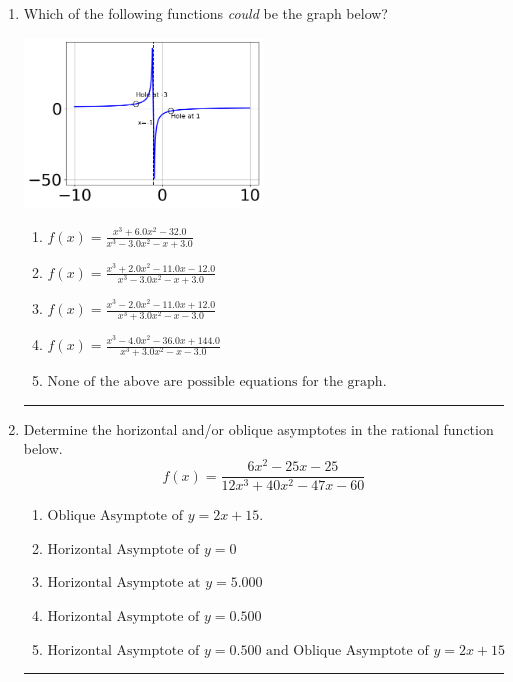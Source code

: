 \documentclass[14pt]{extbook}
\newcommand{\litem}[1]{\item#1\hspace*{-1cm}\rule{\textwidth}{0.4pt}}
\begin{document}
\begin{enumerate}
{\begin{enumerate}[label=\Alph*.]
\end{enumerate} }
\litem{
Which of the following functions \textit{could} be the graph below?
\begin{center}
    \includegraphics[width=0.5\textwidth]{../Figures/identifyGraphOfRationalFunctionCopyB.png}
\end{center}
\begin{enumerate}[label=\Alph*.]
\item \( f(x)=\frac{x^{3} +6.0 x^{2} -32.0}{x^{3} -3.0 x^{2} -x + 3.0} \)
\item \( f(x)=\frac{x^{3} +2.0 x^{2} -11.0 x -12.0}{x^{3} -3.0 x^{2} -x + 3.0} \)
\item \( f(x)=\frac{x^{3} -2.0 x^{2} -11.0 x + 12.0}{x^{3} +3.0 x^{2} -x -3.0} \)
\item \( f(x)=\frac{x^{3} -4.0 x^{2} -36.0 x + 144.0}{x^{3} +3.0 x^{2} -x -3.0} \)
\item \( \text{None of the above are possible equations for the graph.} \)

\end{enumerate} }
\litem{
Determine the horizontal and/or oblique asymptotes in the rational function below.\[ f(x) = \frac{6x^{2} -25 x -25}{12x^{3} +40 x^{2} -47 x -60} \]\begin{enumerate}[label=\Alph*.]
\item \( \text{Oblique Asymptote of } y = 2x + 15. \)
\item \( \text{Horizontal Asymptote of } y = 0 \)
\item \( \text{Horizontal Asymptote at } y = 5.000 \)
\item \( \text{Horizontal Asymptote of } y = 0.500  \)
\item \( \text{Horizontal Asymptote of } y = 0.500 \text{ and Oblique Asymptote of } y = 2x + 15 \)


\end{enumerate}}
\end{enumerate}
\end{document}
